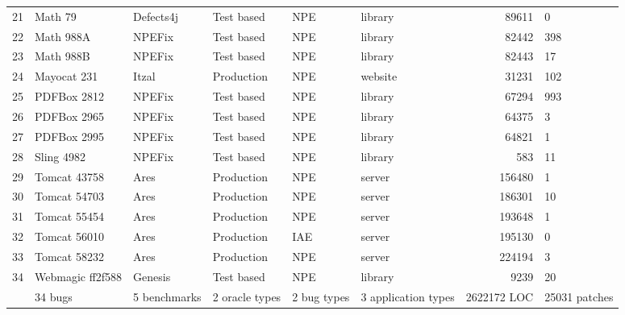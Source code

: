 \begin{table}
\begin{tabular}{|r|l|l|l|l|l|r|}
    21 & Math 79 & Defects4j & Test based & NPE & library & 89611 & 0 \\
    22 & Math 988A & NPEFix & Test based & NPE & library & 82442 & 398 \\
    23 & Math 988B & NPEFix & Test based & NPE & library & 82443 & 17 \\
    24 & Mayocat 231 & Itzal & Production & NPE & website & 31231 & 102 \\
    25 & PDFBox 2812 & NPEFix & Test based & NPE & library & 67294 & 993 \\
    26 & PDFBox 2965 & NPEFix & Test based & NPE & library & 64375 & 3 \\
    27 & PDFBox 2995 & NPEFix & Test based & NPE & library & 64821 & 1 \\
    28 & Sling 4982 & NPEFix & Test based & NPE & library & 583 & 11 \\
    29 & Tomcat 43758 & Ares & Production & NPE & server & 156480 & 1 \\
    30 & Tomcat 54703 & Ares & Production & NPE & server & 186301 & 10 \\
    31 & Tomcat 55454 & Ares & Production & NPE & server & 193648 & 1 \\
    32 & Tomcat 56010 & Ares & Production & IAE & server & 195130 & 0 \\
    33 & Tomcat 58232 & Ares & Production & NPE & server & 224194 & 3 \\
    34 & Webmagic ff2f588 & Genesis & Test based & NPE & library & 9239 & 20 \\
    \hline
    & 34 bugs & 5 benchmarks & 2 oracle types & 2 bug types & 3 application types & 2622172 LOC & 25031 patches \\
    \hline
  \end{tabular}
\end{table}